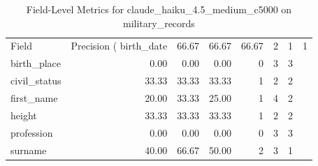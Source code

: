 \begin{table}
\caption{Field-Level Metrics for claude_haiku_4.5_medium_c5000 on military_records}
\label{tab:fields_claude_haiku_4.5_medium_c5000_military_records}
\begin{tabular}{lrrrrrr}
\toprule
Field & Precision (%
\midrule
birth_date & 66.67 & 66.67 & 66.67 & 2 & 1 & 1 \\
birth_place & 0.00 & 0.00 & 0.00 & 0 & 3 & 3 \\
civil_status & 33.33 & 33.33 & 33.33 & 1 & 2 & 2 \\
first_name & 20.00 & 33.33 & 25.00 & 1 & 4 & 2 \\
height & 33.33 & 33.33 & 33.33 & 1 & 2 & 2 \\
profession & 0.00 & 0.00 & 0.00 & 0 & 3 & 3 \\
surname & 40.00 & 66.67 & 50.00 & 2 & 3 & 1 \\
\bottomrule
\end{tabular}
\end{table}
